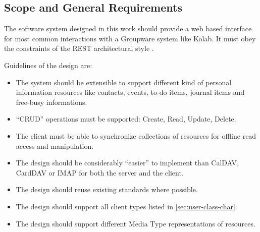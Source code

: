 \documentclass[11pt,a4paper,headsepline,twoside]{scrartcl}		%
\begin{document}
\subsection{Scope and General Requirements}

The software system designed in this work should provide a web based interface
for most common interactions with a Groupware system like Kolab. It must obey
the constraints of the REST architectural style \cite{Fielding2000}.

Guidelines of the design are:

\begin{itemize}
\item The system should be extensible to support different kind of personal
  information resources like contacts, events, to-do items, journal items and
  free-busy informations.
  \item ``CRUD'' operations must be supported: Create, Read, Update, Delete.
  \item The client must be able to synchronize collections of resources for
    offline read access and manipulation.
  \item The design should be considerably ``easier'' to implement than CalDAV,
    CardDAV or IMAP for both the server and the client.
  \item The design should reuse existing standards where possible.
  \item The design should support all client types listed in
    \autoref{sec:user-class-char}.
  \item The design should support different Media Type representations of
    resources.
\end{itemize}
\end{document}

